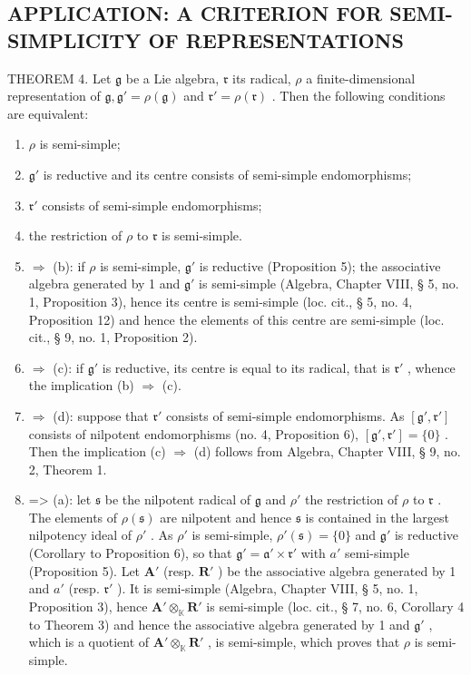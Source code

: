 \subsection{APPLICATION: A CRITERION FOR SEMI-SIMPLICITY OF REPRESENTATIONS}

THEOREM 4. Let \(\mathfrak{g}\) be a Lie algebra, \(\mathfrak{r}\) its radical, \(\rho\) a finite-dimensional representation of \(\mathfrak{g},\mathfrak{g}' = \rho (\mathfrak{g})\) and \(\mathfrak{r}' = \rho (\mathfrak{r})\) . Then the following conditions are equivalent:

\begin{enumerate}
\def\labelenumi{(\alph{enumi})}
\item
  \(\rho\) is semi-simple;
\item
  \(\mathfrak{g}'\) is reductive and its centre consists of semi-simple endomorphisms;
\item
  \(\mathfrak{r}'\) consists of semi-simple endomorphisms;
\item
  the restriction of \(\rho\) to \(\mathfrak{r}\) is semi-simple.
\item
  \(\Rightarrow\) (b): if \(\rho\) is semi-simple, \(\mathfrak{g}'\) is reductive (Proposition 5); the associative algebra generated by 1 and \(\mathfrak{g}'\) is semi-simple (Algebra, Chapter VIII, § 5, no. 1, Proposition 3), hence its centre is semi-simple (loc. cit., § 5, no. 4, Proposition 12) and hence the elements of this centre are semi-simple (loc. cit., § 9, no. 1, Proposition 2).
\item
  \(\Rightarrow\) (c): if \(\mathfrak{g}'\) is reductive, its centre is equal to its radical, that is \(\mathfrak{r}'\) , whence the implication (b) \(\Rightarrow\) (c).
\item
  \(\Rightarrow\) (d): suppose that \(\mathfrak{r}'\) consists of semi-simple endomorphisms. As \([\mathfrak{g}',\mathfrak{r}']\) consists of nilpotent endomorphisms (no. 4, Proposition 6), \([\mathfrak{g}',\mathfrak{r}'] = \{0\}\) . Then the implication (c) \(\Rightarrow\) (d) follows from Algebra, Chapter VIII, § 9, no. 2, Theorem 1.
\item
  =\textgreater{} (a): let \(\mathfrak{s}\) be the nilpotent radical of \(\mathfrak{g}\) and \(\rho'\) the restriction of \(\rho\) to \(\mathfrak{r}\) . The elements of \(\rho(\mathfrak{s})\) are nilpotent and hence \(\mathfrak{s}\) is contained in the largest nilpotency ideal of \(\rho'\) . As \(\rho'\) is semi-simple, \(\rho'(\mathfrak{s}) = \{0\}\) and \(\mathfrak{g}'\) is reductive (Corollary to Proposition 6), so that \(\mathfrak{g}' = \mathfrak{a}' \times \mathfrak{r}'\) with \(a'\) semi-simple (Proposition 5). Let \(\mathbf{A}'\) (resp. \(\mathbf{R}'\) ) be the associative algebra generated by 1 and \(a'\) (resp. \(\mathfrak{r}'\) ). It is semi-simple (Algebra, Chapter VIII, § 5, no. 1, Proposition 3), hence \(\mathbf{A}' \otimes_{\mathbb{K}} \mathbf{R}'\) is semi-simple (loc. cit., § 7, no. 6, Corollary 4 to Theorem 3) and hence the associative algebra generated by 1 and \(\mathfrak{g}'\) , which is a quotient of \(\mathbf{A}' \otimes_{\mathbb{K}} \mathbf{R}'\) , is semi-simple, which proves that \(\rho\) is semi-simple.
\end{enumerate}

